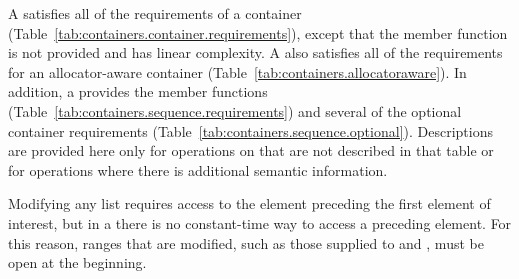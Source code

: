 \pnum
A  satisfies all of the requirements of a container
(Table~\ref{tab:containers.container.requirements}), except that the 
member function is not provided and  has linear complexity.
A  also satisfies all of the requirements for an allocator-aware
container (Table~\ref{tab:containers.allocatoraware}). In addition, a 
provides the  member functions
(Table~\ref{tab:containers.sequence.requirements}) and several of the optional
container requirements (Table~\ref{tab:containers.sequence.optional}).
Descriptions are provided here only for operations on
 that are not described in that table or for operations where there
is additional semantic information.

\pnum
\enternote Modifying any list requires access to the element preceding the first element
of interest, but in a  there is no constant-time way to access a
preceding element. For this reason, ranges that are modified, such as those supplied to
 and , must be open at the beginning. \exitnote

